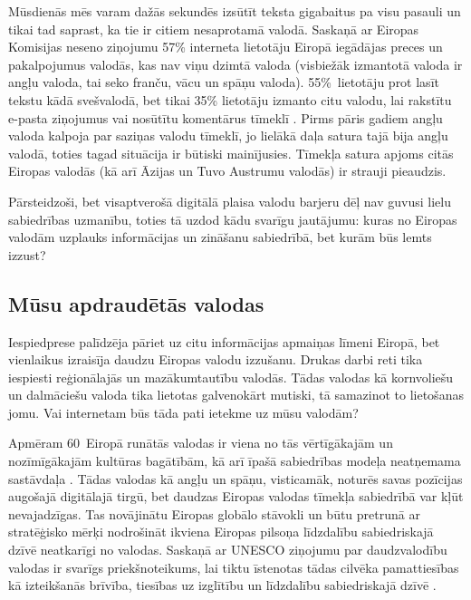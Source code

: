 \begin{multicols}{2}
Mūsdienās mēs varam dažās sekundēs izsūtīt teksta gigabaitus pa visu pasauli un tikai tad saprast, ka tie ir citiem nesaprotamā valodā. 
Saskaņā ar Eiropas Komisijas neseno ziņojumu 57\% interneta lietotāju Eiropā iegādājas preces un pakalpojumus valodās, kas nav viņu dzimtā valoda (visbiežāk izmantotā valoda ir angļu valoda, tai seko franču, vācu un spāņu valoda). 
55\%~lietotāju prot lasīt tekstu kādā svešvalodā, bet tikai 35\% lietotāju izmanto citu valodu, lai rakstītu e-pasta ziņojumus vai nosūtītu komentārus tīmeklī \cite{Meta48}. 
Pirms pāris gadiem angļu valoda kalpoja par saziņas valodu tīmeklī, jo lielākā daļa satura tajā bija angļu valodā, toties tagad situācija ir būtiski mainījusies. 
Tīmekļa satura apjoms citās Eiropas valodās (kā arī Āzijas un Tuvo Austrumu valodās) ir strauji pieaudzis.

Pārsteidzoši, bet visaptverošā digitālā plaisa valodu barjeru dēļ nav guvusi lielu sabiedrības uzmanību, toties tā uzdod kādu svarīgu jautājumu: kuras no Eiropas valodām uzplauks informācijas un zināšanu sabiedrībā, bet kurām būs lemts izzust?

\subsection{Mūsu apdraudētās valodas}

Iespiedprese palīdzēja pāriet uz citu informācijas apmaiņas līmeni Eiropā, bet vienlaikus izraisīja daudzu Eiropas valodu izzušanu. 
Drukas darbi reti tika iespiesti reģionālajās un mazākumtautību valodās. 
Tādas valodas kā kornvoliešu un dalmāciešu valoda tika lietotas galvenokārt mutiski, tā samazinot to lietošanas jomu. 
Vai internetam būs tāda pati ietekme uz mūsu valodām?


Apmēram 60~Eiropā runātās valodas ir viena no tās vērtīgākajām un nozīmīgākajām kultūras bagātībām, kā arī īpašā sabiedrības modeļa neatņemama sastāvdaļa \cite{Meta49}.
 Tādas valodas kā angļu un spāņu, visticamāk, noturēs savas pozīcijas augošajā digitālajā tirgū, bet daudzas Eiropas valodas tīmekļa sabiedrībā var kļūt nevajadzīgas. 
Tas novājinātu Eiropas globālo stāvokli un būtu pretrunā ar stratēģisko mērķi nodrošināt ikviena Eiropas pilsoņa līdzdalību sabiedriskajā dzīvē neatkarīgi no valodas. 
Saskaņā ar UNESCO ziņojumu par daudzvalodību valodas ir svarīgs priekšnoteikums, lai tiktu īstenotas tādas cilvēka pamattiesības kā izteikšanās brīvība, tiesības uz izglītību un līdzdalību sabiedriskajā dzīvē \cite{Meta50}.


\end{multicols}

